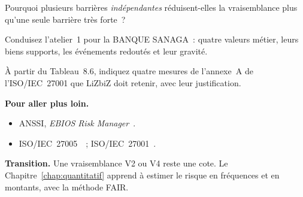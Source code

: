 \begin{boxexo}[title={\ding{45}\quad Exercice~8.8. Barrières indépendantes \niveaumoyen}]
Pourquoi plusieurs barrières \emph{indépendantes} réduisent-elles la
vraisemblance plus qu'une seule barrière très forte~?
\end{boxexo}

\begin{boxexo}[title={\ding{45}\quad Exercice~8.9. L'atelier 1 de la banque \niveauexpert}]
Conduisez l'atelier~1 pour la BANQUE SANAGA~: quatre valeurs métier, leurs
biens supports, les événements redoutés et leur gravité.
\end{boxexo}

\begin{boxexo}[title={\ding{45}\quad Exercice~8.10. Déclaration d'applicabilité \niveauexpert}]
À partir du Tableau~8.6, indiquez quatre mesures de l'annexe~A de
l'ISO/IEC~27001 que LiZbiZ doit retenir, avec leur justification.
\end{boxexo}

\bigskip

\begin{boxinfo}
\textbf{Pour aller plus loin.}
\begin{itemize}
    \item ANSSI, \emph{EBIOS Risk Manager}~\cite{anssi2018ebios}.
    \item ISO/IEC~27005~\cite{iso27005_2022}~; ISO/IEC~27001~\cite{iso27001_2022}.
\end{itemize}
\end{boxinfo}

\begin{boxinfo}
\textbf{Transition.} Une vraisemblance V2 ou V4 reste une cote. Le
Chapitre~\ref{chap:quantitatif} apprend à estimer le risque en fréquences
et en montants, avec la méthode FAIR.
\end{boxinfo}
